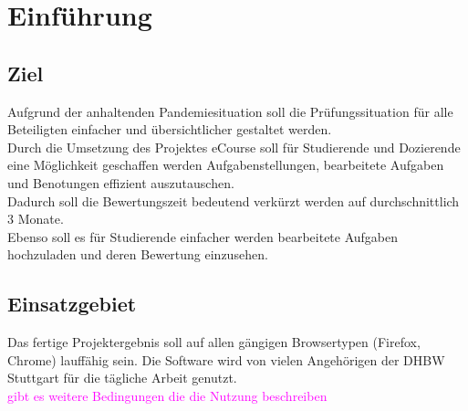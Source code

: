 
\chapter{Einführung}

\section{Ziel}
Aufgrund der anhaltenden Pandemiesituation soll die Prüfungssituation für alle Beteiligten einfacher und übersichtlicher gestaltet werden. \\
Durch die Umsetzung des Projektes eCourse soll für Studierende und Dozierende eine Möglichkeit geschaffen werden Aufgabenstellungen, bearbeitete Aufgaben und Benotungen effizient auszutauschen. \\
Dadurch soll die Bewertungszeit bedeutend verkürzt werden auf durchschnittlich 3 Monate. \\
Ebenso soll es für Studierende einfacher werden bearbeitete Aufgaben hochzuladen und deren Bewertung einzusehen. \\

\section{Einsatzgebiet}
Das fertige Projektergebnis soll auf allen gängigen Browsertypen (Firefox, Chrome) lauffähig sein. Die Software wird von vielen Angehörigen der DHBW Stuttgart für die tägliche Arbeit genutzt. \\
\textcolor{magenta}{gibt es weitere Bedingungen die die Nutzung beschreiben}


